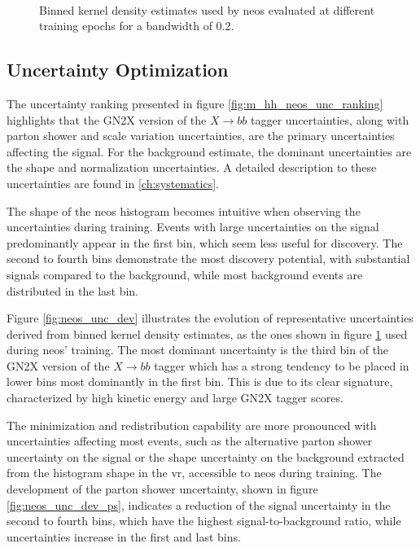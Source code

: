 \begin{figure}
    \centering
    \\
    \caption[]{Binned kernel density estimates used by \ac{neos} evaluated at different training epochs for a bandwidth of 0.2.}
    \label{fig:neos_valid_kde_hists}
\end{figure}



\subsection{Uncertainty Optimization}

The uncertainty ranking presented in figure \ref{fig:m_hh_neos_unc_ranking} highlights that the GN2X version of the $X \rightarrow bb$ tagger uncertainties, along with parton shower and scale variation uncertainties, are the primary uncertainties affecting the signal. For the background estimate, the dominant uncertainties are the shape and normalization uncertainties. A detailed description to these uncertainties are found in \ref{ch:systematics}.


The shape of the \ac{neos} histogram becomes intuitive when observing the uncertainties during training. Events with large uncertainties on the signal predominantly appear in the first bin, which seem less useful for discovery. The second to fourth bins demonstrate the most discovery potential, with substantial signals compared to the background, while most background events are distributed in the last bin.

Figure \ref{fig:neos_unc_dev} illustrates the evolution of representative uncertainties derived from binned kernel density estimates, as the ones shown in figure \ref{fig:neos_valid_kde_hists}  used during \ac{neos}' training. The most dominant uncertainty is the third \pt bin of the GN2X version of the $X \rightarrow bb$ tagger which has a strong tendency to be placed in lower bins most dominantly in the first bin. This is due to its clear signature, characterized by high kinetic energy and large GN2X tagger scores.


The minimization and redistribution capability are more pronounced with uncertainties affecting most events, such as the alternative parton shower uncertainty on the signal or the shape uncertainty on the background extracted from the histogram shape in the \ac{vr}, accessible to \ac{neos} during training. The development of the parton shower uncertainty, shown in figure \ref{fig:neos_unc_dev_ps}, indicates a reduction of the signal uncertainty in the second to fourth bins, which have the highest signal-to-background ratio, while uncertainties increase in the first and last bins.


